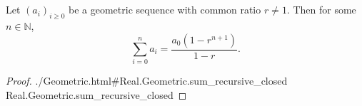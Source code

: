 \documentclass{article}
\newcommand{\lean}[1]{\leanref
  {./Geometric.html\#Real.Geometric.#1}
  {Real.Geometric.#1}}
\begin{document}
\section{}%
%

Let $(a_i)_{i \geq 0}$ be a geometric sequence with common ratio $r \neq 1$.
Then for some $n \in \mathbb{N}$,
$$\sum_{i=0}^n a_i = \frac{a_0(1 - r^{n+1})}{1 - r}.$$

\begin{proof}

  \lean{sum\_recursive\_closed}

\end{proof}
\end{document}
